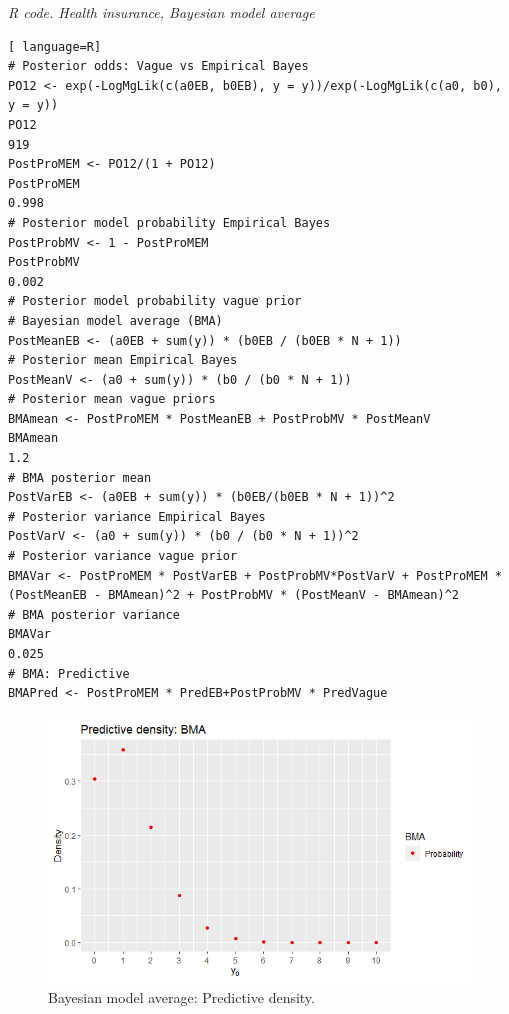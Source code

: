 \begin{tcolorbox}[enhanced,width=4.67in,center upper,
	fontupper=\large\bfseries,drop shadow southwest,sharp corners]
\textit{R code. Health insurance, Bayesian model average}
\begin{VF}
\begin{lstlisting}[ language=R]
# Posterior odds: Vague vs Empirical Bayes
PO12 <- exp(-LogMgLik(c(a0EB, b0EB), y = y))/exp(-LogMgLik(c(a0, b0), y = y))
PO12
919
PostProMEM <- PO12/(1 + PO12) 
PostProMEM
0.998
# Posterior model probability Empirical Bayes
PostProbMV <- 1 - PostProMEM 
PostProbMV
0.002
# Posterior model probability vague prior
# Bayesian model average (BMA)
PostMeanEB <- (a0EB + sum(y)) * (b0EB / (b0EB * N + 1)) 
# Posterior mean Empirical Bayes 
PostMeanV <- (a0 + sum(y)) * (b0 / (b0 * N + 1)) 
# Posterior mean vague priors
BMAmean <- PostProMEM * PostMeanEB + PostProbMV * PostMeanV  
BMAmean
1.2
# BMA posterior mean
PostVarEB <- (a0EB + sum(y)) * (b0EB/(b0EB * N + 1))^2 
# Posterior variance Empirical Bayes
PostVarV <- (a0 + sum(y)) * (b0 / (b0 * N + 1))^2 
# Posterior variance vague prior 
BMAVar <- PostProMEM * PostVarEB + PostProbMV*PostVarV + PostProMEM * (PostMeanEB - BMAmean)^2 + PostProbMV * (PostMeanV - BMAmean)^2
# BMA posterior variance   
BMAVar
0.025
# BMA: Predictive
BMAPred <- PostProMEM * PredEB+PostProbMV * PredVague    
\end{lstlisting}
\end{VF}
\end{tcolorbox}

\begin{figure}[!h]
	\includegraphics[width=340pt, height=200pt]{Chapters/chapter1/figures/BMA.png}
	\caption[List of figure caption goes here]{Bayesian model average: Predictive density.}\label{fig15}
\end{figure}

